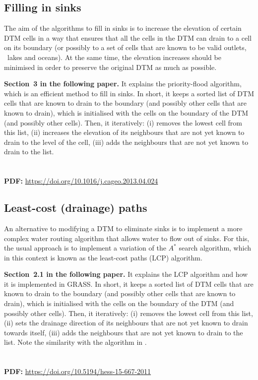 \subsection{Filling in sinks}

The aim of the algorithms to fill in sinks is to increase the elevation of certain DTM cells in a way that ensures that all the cells in the DTM can drain to a cell on its boundary (or possibly to a set of cells that are known to be valid outlets, \eg\ lakes and oceans)\@.
At the same time, the elevation increases should be minimised in order to preserve the original DTM as much as possible.

\begin{kaobox}[frametitle=\faExternalLink\ To read or to watch.]
\textbf{Section~3 in the following paper.} It explains the priority-flood algorithm, which is an efficient method to fill in sinks.
In short, it keeps a sorted list of DTM cells that are known to drain to the boundary (and possibly other cells that are known to drain), which is initialised with the cells on the boundary of the DTM (and possibly other cells)\@.
Then, it iteratively: (i) removes the lowest cell from this list, (ii) increases the elevation of its neighbours that are not yet known to drain to the level of the cell, (iii) adds the neighbours that are not yet known to drain to the list.
\\
\\
\\
\textbf{PDF:} \url{https://doi.org/10.1016/j.cageo.2013.04.024}
\end{kaobox}

\subsection{Least-cost (drainage) paths}

An alternative to modifying a DTM to eliminate sinks is to implement a more complex water routing algorithm that allows water to flow out of sinks.
For this, the usual approach is to implement a variation of the \(A^{*}\) search algorithm, which in this context is known as the least-cost paths (LCP) algorithm.

\begin{kaobox}[frametitle=\faExternalLink\ To read or to watch.]
\textbf{Section~2.1 in the following paper.} It explains the LCP algorithm and how it is implemented in GRASS\@.
In short, it keeps a sorted list of DTM cells that are known to drain to the boundary (and possibly other cells that are known to drain), which is initialised with the cells on the boundary of the DTM (and possibly other cells)\@.
Then, it iteratively: (i) removes the lowest cell from this list, (ii) sets the drainage direction of its neighbours that are not yet known to drain towards itself, (iii) adds the neighbours that are not yet known to drain to the list.
Note the similarity with the algorithm in \citet{Barnes14a}.
\\
\\
\\
\textbf{PDF:} \url{https://doi.org/10.5194/hess-15-667-2011}
\end{kaobox}


